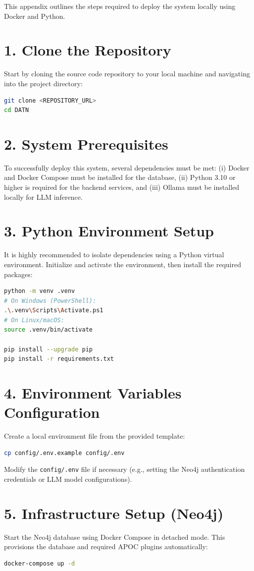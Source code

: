\documentclass[../main.tex]{subfiles}
\begin{document}
This appendix outlines the steps required to deploy the system locally using Docker and Python.

\section*{1. Clone the Repository}
Start by cloning the source code repository to your local machine and navigating into the project directory:
\begin{lstlisting}[language=bash, breaklines=true]
git clone <REPOSITORY_URL>
cd DATN
\end{lstlisting}

\section*{2. System Prerequisites}
To successfully deploy this system, several dependencies must be met: (i) Docker and Docker Compose must be installed for the database, (ii) Python 3.10 or higher is required for the backend services, and (iii) Ollama must be installed locally for LLM inference.

\section*{3. Python Environment Setup}
It is highly recommended to isolate dependencies using a Python virtual environment. Initialize and activate the environment, then install the required packages:
\begin{lstlisting}[language=bash, breaklines=true]
python -m venv .venv
# On Windows (PowerShell):
.\.venv\Scripts\Activate.ps1
# On Linux/macOS:
source .venv/bin/activate

pip install --upgrade pip
pip install -r requirements.txt
\end{lstlisting}

\section*{4. Environment Variables Configuration}
Create a local environment file from the provided template:
\begin{lstlisting}[language=bash, breaklines=true]
cp config/.env.example config/.env
\end{lstlisting}
Modify the \texttt{config/.env} file if necessary (e.g., setting the Neo4j authentication credentials or LLM model configurations).

\section*{5. Infrastructure Setup (Neo4j)}
Start the Neo4j database using Docker Compose in detached mode. This provisions the database and required APOC plugins automatically:
\begin{lstlisting}[language=bash, breaklines=true]
docker-compose up -d
\end{lstlisting}
\end{document}
